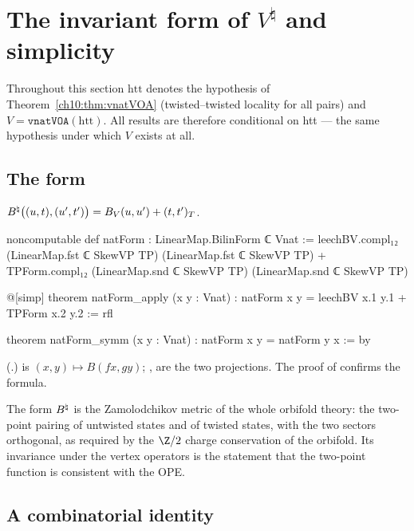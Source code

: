 \section{The invariant form of \texorpdfstring{$V^\natural$}{V natural} and simplicity}\label{ch10:sec:simple}

Throughout this section $\mathrm{htt}$ denotes the hypothesis of Theorem~\ref{ch10:thm:vnatVOA}
(twisted--twisted locality for all pairs) and $V=\mathtt{vnatVOA}(\mathrm{htt})$.  All results
are therefore conditional on htt --- the same hypothesis under which $V$ exists at all.

\subsection{The form}

\begin{definition}\label{ch10:def:natForm}
$B^{\natural}\bigl((u,t),(u',t')\bigr)=B_V(u,u')+(t,t')_T$.
\end{definition}
\begin{leancode}
noncomputable def natForm : LinearMap.BilinForm ℂ Vnat :=
  leechBV.compl₁₂ (LinearMap.fst ℂ SkewVP TP) (LinearMap.fst ℂ SkewVP TP)
    + TPForm.compl₁₂ (LinearMap.snd ℂ SkewVP TP) (LinearMap.snd ℂ SkewVP TP)

@[simp] theorem natForm_apply (x y : Vnat) : natForm x y = leechBV x.1 y.1 + TPForm x.2 y.2 := rfl

theorem natForm_symm (x y : Vnat) : natForm x y = natForm y x := by
\end{leancode}
(.)   is $(x,y)\mapsto B(fx,gy)$;
,  are the two projections.  The  proof of 
confirms the formula.

\begin{physics}
The form $B^{\natural}$ is the Zamolodchikov metric of the whole orbifold theory: the two-point pairing of untwisted states and of twisted states, with the two sectors orthogonal, as required by the $\Z/2$ charge conservation of the orbifold. Its invariance under the vertex operators is the statement that the two-point function is consistent with the OPE.
\end{physics}

\subsection{A combinatorial identity}

